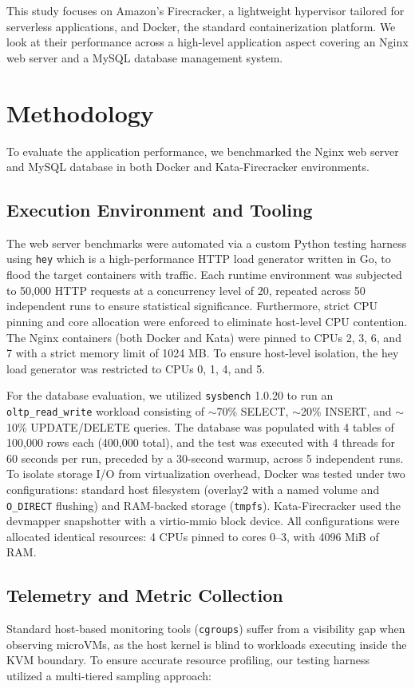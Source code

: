 \documentclass[conference]{IEEEtran}
\begin{document}
This study focuses on Amazon's Firecracker, a lightweight hypervisor tailored for serverless applications, and Docker, the standard containerization platform. We look at their performance across a high-level application aspect covering an Nginx web server and a MySQL database management system. 

\section{Methodology}
To evaluate the application performance, we benchmarked the Nginx web server and MySQL database in both Docker and Kata-Firecracker environments. 

\subsection{Execution Environment and Tooling}
The web server benchmarks were automated via a custom Python testing harness using \texttt{hey} which is a high-performance HTTP load generator written in Go, to flood the target containers with traffic. Each runtime environment was subjected to 50,000 HTTP requests at a concurrency level of 20, repeated across 50 independent runs to ensure statistical significance. Furthermore, strict CPU pinning and core allocation were enforced to eliminate host-level CPU contention. The Nginx containers (both Docker and Kata) were pinned to CPUs 2, 3, 6, and 7 with a strict memory limit of 1024 MB. To ensure host-level isolation, the hey load generator was restricted to CPUs 0, 1, 4, and 5.

For the database evaluation, we utilized \texttt{sysbench} 1.0.20 to run an \texttt{oltp\_read\_write} workload consisting of $\sim$70\% SELECT, $\sim$20\% INSERT, and $\sim$10\% UPDATE/DELETE queries. The database was populated with 4 tables of 100,000 rows each (400,000 total), and the test was executed with 4 threads for 60 seconds per run, preceded by a 30-second warmup, across 5 independent runs. To isolate storage I/O from virtualization overhead, Docker was tested under two configurations: standard host filesystem (overlay2 with a named volume and \texttt{O\_DIRECT} flushing) and RAM-backed storage (\texttt{tmpfs}). Kata-Firecracker used the devmapper snapshotter with a virtio-mmio block device. All configurations were allocated identical resources: 4 CPUs pinned to cores 0--3, with 4096 MiB of RAM.

\subsection{Telemetry and Metric Collection}
Standard host-based monitoring tools (\texttt{cgroups}) suffer from a visibility gap when observing microVMs, as the host kernel is blind to workloads executing inside the KVM boundary. To ensure accurate resource profiling, our testing harness utilized a multi-tiered sampling approach:
\end{document}
